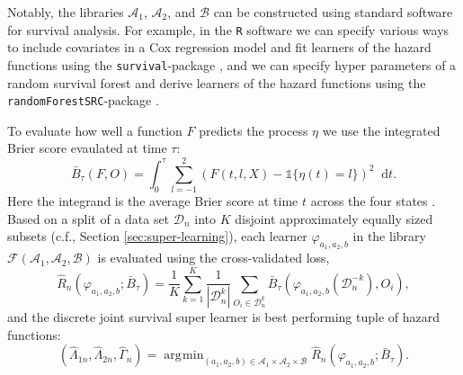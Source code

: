 \documentclass[lineno]{biometrika}
\renewcommand{\phi}{\varphi}
\newcommand*\diff{\mathop{}\!\mathrm{d}}
\newcommand{\1}{\mathds{1}}
\DeclareMathOperator*{\argmin}{\arg\!\min}
\newcommand{\data}{\ensuremath{\mathcal{D}}}
\begin{document}
  Notably, the libraries \( \mathcal{A}_1 \), \(
\mathcal{A}_2 \), and \( \mathcal{B} \) can be constructed using
standard software for survival analysis.  For example, in the
\texttt{R} software we can specify various ways to include covariates
in a Cox regression model and fit learners of the hazard functions
using the \texttt{survival}-package \citep{survival-package}, and we
can specify hyper parameters of a random survival forest and derive
learners of the hazard functions using the
\texttt{randomForestSRC}-package \citep{randomForestSRC}.

To evaluate how well a function \( F \) predicts the
process $\eta$ we use the integrated Brier score \citep{graf1999assessment}
evaulated at time \(\tau\):
\begin{equation*}
  \bar B_\tau(F,O) = \int_0^{\tau} \sum_{l=-1}^{2}
  \left(
      F(t,l,X) - \1{\{\eta(t)=l\}}
  \right)^2\diff t.
\end{equation*} Here the integrand is the average Brier score at time \(t\) across
the four states \citep{brier1950verification}. Based on a split of a
data set \(\data_n\) into $K$ disjoint approximately equally sized
subsets (c.f., Section \ref{sec:super-learning}), each learner \(
\phi_{a_1, a_2, b} \) in the library \( \mathcal{F}(\mathcal{A}_1,
\mathcal{A}_2, \mathcal{B}) \) is evaluated using the cross-validated
loss,
\begin{equation*}
  \hat{R}_{n}(\phi_{a_1,a_2,b} ; \bar{B}_{\tau}) =
  \frac{1}{K}\sum_{k=1}^{K}
  \frac{1}{| \data_n^{k} |}\sum_{O_i \in \data_n^{k}}
  \bar B_\tau
  {
    \left(
      \phi_{a_1,a_2,b}{ (\data_n^{-k})}
      , O_i
    \right)
  },
\end{equation*}
and the discrete joint survival super learner is best performing tuple of hazard functions:
\begin{equation}\label{eq:discrete-JSLL}
  (\hat \Lambda_{1n},\hat \Lambda_{2n}, \hat \Gamma_{n})
  =  \argmin_{(a_1,a_2,b)\in \mathcal{A}_1\times\mathcal{A}_2\times\mathcal{B}}
    \hat{R}_{n}(\phi_{a_1,a_2,b} ; \bar{B}_{\tau}).
\end{equation}
  

\end{document}
